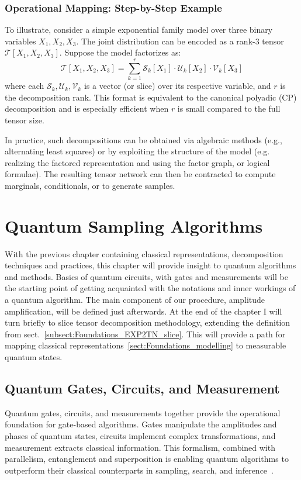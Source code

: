 \documentclass[encoding=utf8,british]{tumphthesis}
\begin{document}
        \subsection{Operational Mapping: Step-by-Step Example}
        \label{subsect:StepByStep}
        To illustrate, consider a simple exponential family model over three binary variables $X_1, X_2, X_3$. The joint distribution can 
        be encoded as a rank-3 tensor $\mathcal{T}[X_1, X_2, X_3]$. Suppose the model factorizes as:
        \begin{equation}
            \mathcal{T}[X_1, X_2, X_3] = \sum_{k=1}^r \mathcal{S}_k[X_1] \cdot \mathcal{U}_k[X_2] \cdot \mathcal{V}_k[X_3]
        \end{equation}
        where each $\mathcal{S}_k, \mathcal{U}_k, \mathcal{V}_k$ is a vector (or slice) over its respective variable, and $r$ is the 
        decomposition rank. This format is equivalent to the canonical polyadic (CP) decomposition and is especially efficient when $r$ is 
        small compared to the full tensor size.

        In practice, such decompositions can be obtained via algebraic methods (e.g., alternating least squares) or by exploiting the 
        structure of the model (e.g. realizing the factored representation and using the factor graph, or logical formulae). The resulting 
        tensor network can then be contracted to compute marginals, conditionals, or to generate samples.


\chapter{Quantum Sampling Algorithms}
    With the previous chapter containing classical representations, decomposition techniques and practices, this chapter will provide insight 
    to quantum algorithms and methods. Basics of quantum circuits, with gates and measurements will be the starting point of getting acquainted with the notations 
    and inner workings of a quantum algorithm. The main component of our procedure, amplitude amplification, will be defined just afterwards. At the end of the chapter 
    I will turn briefly to slice tensor decomposition methodology, extending the definition from sect.~\ref{subsect:Foundations_EXP2TN_slice}. This will provide a path 
    for mapping classical representations~\ref{sect:Foundations_modelling} to measurable quantum states.
    \section{Quantum Gates, Circuits, and Measurement}
    \label{sect:QSA_Basics}
    Quantum gates, circuits, and measurements together provide the operational foundation for gate-based algorithms. Gates manipulate the 
    amplitudes and phases of quantum states, circuits implement complex transformations, and measurement extracts classical information. 
    This formalism, combined with parallelism, entanglement and superposition is enabling quantum algorithms to outperform their classical counterparts in sampling, search, and inference~\cite{Nielsen_Chuang_2010}.
\end{document}
